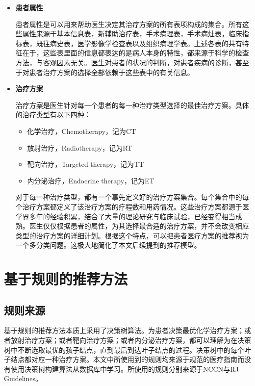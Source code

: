 \begin{itemize}

\item \textbf{患者属性}

患者属性是可以用来帮助医生决定其治疗方案的所有表项构成的集合。所有这些属性来源于基本信息表，新辅助治疗表，手术病理表，手术病灶表，临床指标表，既往病史表，医学影像学检查表以及组织病理学表。上述各表的共有特征在于，这些表里面的信息都表达的是病人本身的特性，都来源于科学的检查方法，与客观因素无关。医生对患者的状况的判断，对患者疾病的诊断，甚至于对患者治疗方案的选择全部依赖于这些表中的有关信息。

\item \textbf{治疗方案}

治疗方案是医生针对每一个患者的每一种治疗类型选择的最佳治疗方案。具体的治疗类型有以下四种：

\begin{itemize}

\item 化学治疗，Chemotherapy，记为CT
\item 放射治疗，Radiotherapy，记为RT
\item 靶向治疗，Targeted therapy，记为TT
\item 内分泌治疗，Endocrine therapy，记为ET

\end{itemize}

对于每一种治疗类型，都有一个事先定义好的治疗方案集合。每个集合中的每个治疗方案都定义了该治疗方案的疗程数和用药情况。这些治疗方案都源于医学界多年的经验积累，结合了大量的理论研究与临床试验，已经变得相当成熟。医生仅仅根据患者的属性，为其选择最合适的治疗方案，并不会改变相应类型的治疗方案的详细计划。根据这个特点，可以把患者医疗方案的推荐视为一个多分类问题。这极大地简化了本文后续提到的推荐模型。

\end{itemize}

\section{基于规则的推荐方法}

\subsection{规则来源}
基于规则的推荐方法本质上采用了决策树算法。为患者决策最优化学治疗方案；或者放射治疗方案；或者靶向治疗方案；或者内分泌治疗方案，都可以理解为在决策树中不断选取最优的孩子结点，直到最后到达叶子结点的过程。决策树中的每个叶子结点都对应一种治疗方案。本文中所使用到的规则均来源于规范的医疗指南而没有使用决策树构建算法从数据库中学习。所使用的规则分别来源于NCCN与RJ Guidelines。


